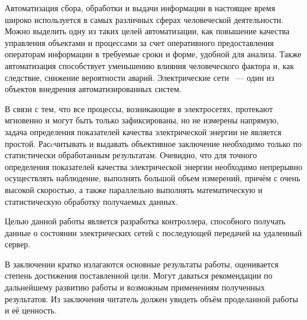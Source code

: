 \documentclass[utf8x,14pt, coursreport]{G7-32}
\begin{document}
\Introduction
Автоматизация сбора, обработки и выдачи информации в настоящее время широко используется в самых различных сферах человеческой деятельности. Можно выделить одну из таких целей автоматизации, как повышение качества управления объектами и процессами за счет оперативного предоставления операторам информации в требуемые сроки и форме, удобной для анализа. Также автоматизация способствует уменьшению влияния человеческого фактора и, как следствие, снижение вероятности аварий. Электрические сети ~--- один из объектов внедрения автоматизированных систем.

В связи с тем, что все процессы, возникающие в электросетях, протекают мгновенно и могут быть только зафиксированы, но не измерены напрямую, задача определения показателей качества электрической энергии не является простой. Расcчитывать и выдавать объективное заключение необходимо только по статистически обработанным результатам. Очевидно, что для точного определения показателей качества электрической энергии необходимо непрерывно осуществлять наблюдение, выполнять большой объем измерений, причём с очень высокой скоростью, а также параллельно выполнять математическую и статистическую обработку получаемых данных.\cite{qualitymonitor}

Целью данной работы является разработка контроллера, способного получать данные о состоянии электрических сетей с последующей передачей на удаленный сервер.


\mainmatter %











\backmatter %

\Conclusion

В заключении кратко излагаются основные результаты работы, оценивается степень достижения поставленной цели. Могут даваться рекомендации по дальнейшему развитию работы и возможным применениям полученных результатов. Из заключения читатель должен увидеть объём проделанной работы и её ценность.
\end{document}
